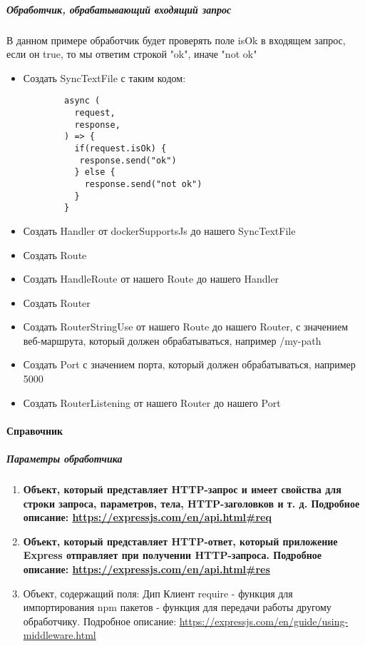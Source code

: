 \documentclass{article}
\begin{document}
\subparagraph{Обработчик, обрабатывающий входящий запрос}
В данном примере обработчик будет проверять поле isOk в входящем запрос, если он true, то мы ответим строкой "ok", иначе "not ok"
\begin{itemize}
  \item Создать SyncTextFile с таким кодом:
    \begin{verbatim}
        async (
          request,
          response,
        ) => {
          if(request.isOk) {
           response.send("ok") 
          } else {
            response.send("not ok")
          }
        }
    \end{verbatim}
  \item Создать Handler от dockerSupportsJs до нашего SyncTextFile
  \item Создать Route
  \item Создать HandleRoute от нашего Route до нашего Handler
  \item Создать Router
  \item Создать RouterStringUse от нашего Route до нашего Router, с значением веб-маршрута, который должен обрабатываться, например /my-path
  \item Создать Port с значением порта, который должен обрабатываться, например 5000
  \item Создать RouterListening от нашего Router до нашего Port
\end{itemize}

\paragraph{Справочник}
\subparagraph{Параметры обработчика}
\begin{enumerate}
    \item \textbf{Объект, который представляет HTTP-запрос и имеет свойства для строки запроса, параметров, тела, HTTP-заголовков и т. д. Подробное описание: \url{https://expressjs.com/en/api.html#req}}
    \item \textbf{Объект, который представляет HTTP-ответ, который приложение Express отправляет при получении HTTP-запроса. Подробное описание: \url{https://expressjs.com/en/api.html#res}}
    \item Объект, содержащий поля:
         Дип Клиент
         require - функция для импортирования npm пакетов
         - функция для передачи работы другому обработчику. Подробное описание: \url{https://expressjs.com/en/guide/using-middleware.html}
\end{enumerate}
\end{document}
